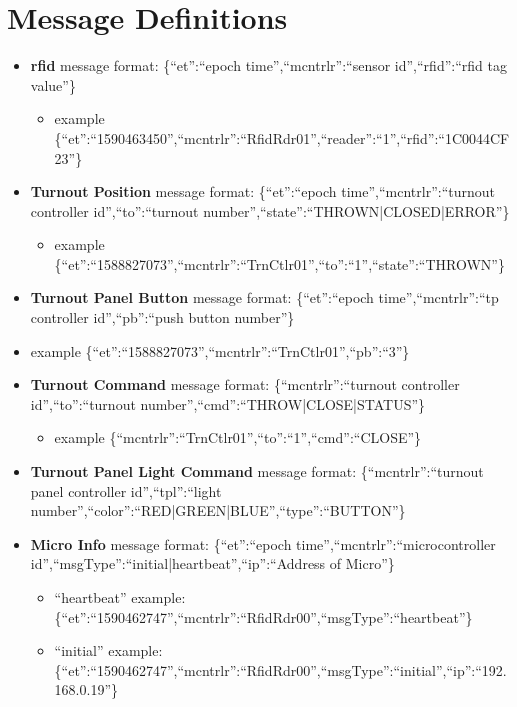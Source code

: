 \section{Message Definitions}
\begin{itemize}
\item \textbf {\gls{rfid}} message format: \{``et'':``epoch time'',``mcntrlr'':``sensor id'',``rfid'':``rfid tag value''\}
\begin{itemize}
\item example \{``et'':``1590463450'',``mcntrlr'':``RfidRdr01'',``reader'':``1'',``rfid'':``1C0044CF23''\}
\end{itemize}
\item \textbf {Turnout Position} message format: \{``et'':``epoch time'',``mcntrlr'':``turnout controller id'',``to'':``turnout number'',``state'':``THROWN|CLOSED|ERROR''\}
\begin{itemize}
\item example \{``et'':``1588827073'',``mcntrlr'':``TrnCtlr01'',``to'':``1'',``state'':``THROWN''\}
\end{itemize}
\item \textbf {Turnout Panel Button} message format: \{``et'':``epoch time'',``mcntrlr'':``tp controller id'',``pb'':``push button number''\}
\item example \{``et'':``1588827073'',``mcntrlr'':``TrnCtlr01'',``pb'':``3''\}
\item \textbf {Turnout Command} message format: \{``mcntrlr'':``turnout controller id'',``to'':``turnout number'',``cmd'':``THROW|CLOSE|STATUS''\}
\begin{itemize}
\item example \{``mcntrlr'':``TrnCtlr01'',``to'':``1'',``cmd'':``CLOSE''\}
\end{itemize}
\item \textbf {Turnout Panel Light Command} message format: \{``mcntrlr'':``turnout panel controller id'',``tpl'':``light number'',``color'':``RED|GREEN|BLUE'',``type'':``BUTTON''\}
\item \textbf {Micro Info} message format: \{``et'':``epoch time'',``mcntrlr'':``microcontroller id'',``msgType'':``initial|heartbeat'',``ip'':``Address of Micro''\}
\begin{itemize}
\item ``heartbeat'' example: \{``et'':``1590462747'',``mcntrlr'':``RfidRdr00'',``msgType'':``heartbeat''\} 
\item ``initial'' example: \{``et'':``1590462747'',``mcntrlr'':``RfidRdr00'',``msgType'':``initial'',``ip'':``192.168.0.19''\}
\end{itemize}
\end{itemize}
